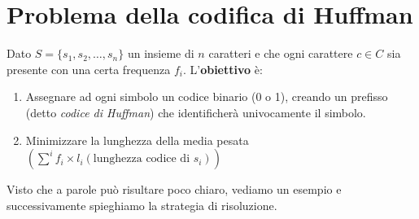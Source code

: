 \section{Problema della codifica di Huffman}
Dato $S = \{ s_1, s_2,\dots ,s_n\}$ un insieme di $n$ caratteri e che ogni carattere
$c \in C$ sia presente con una certa frequenza $f_i$. L'\textbf{obiettivo}
è:
\begin{enumerate}
    \item Assegnare ad ogni simbolo un codice binario (0 o 1), creando un prefisso (detto \textit{codice di Huffman}) che
    identificherà univocamente il simbolo.
    \item Minimizzare la lunghezza della media pesata $\left(  \sum^{i} f_i \times l_i
    (\text{lunghezza codice di } s_i)  \right)$ 
\end{enumerate}
Visto che a parole può risultare poco chiaro, vediamo un esempio e successivamente spieghiamo
la strategia di risoluzione.

